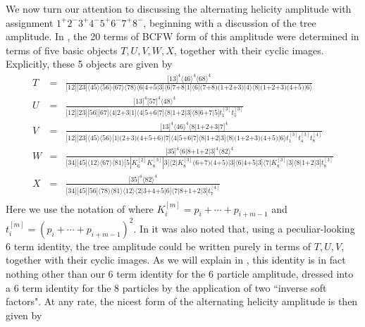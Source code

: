 \documentclass[12pt]{article}
\newcommand{\nn}{\nonumber}
\newcommand{\be}{\begin{eqnarray}}
\newcommand{\ee}{\end{eqnarray}}
\begin{document}
We now turn our attention to discussing the alternating helicity amplitude with assignment $1^+ 2^- 3^+ 4^- 5^+ 6^- 7^+ 8^-$, beginning with a discussion of the tree amplitude. In \cite{bcf}, the 20 terms of BCFW form of this amplitude were determined in terms of five basic objects $T,U,V,W,X$, together with their cyclic images. Explicitly, these 5 objects are given by
\be
T\! &=&\! \frac{\text{[13]}^4 \text{$\langle $46$\rangle $}^4
   \text{$\langle $68$\rangle $}^4}{\text{[12]} \text{[23]}
   \text{$\langle $45$\rangle $} \text{$\langle $56$\rangle
   $}\text{$\langle
   $67$\rangle $} \text{$\langle $78$\rangle $} \text{$\langle $6$|$4+5$|$3]} \text{$\langle
   $6$|$7+8$|$1]} \text{$\langle
   $6$|$(7+8)$$(1+2+3)$|$4$\rangle $}
   \text{$\langle $8$|$(1+2+3)$$(4+5)$|$6$\rangle $}} \nn\\
U\! &=&\! \frac{\text{[13]}^4 \text{[57]}^4 \text{$\langle
   $48$\rangle $}^4}{\text{[12]} \text{[23]} \text{[56]}
   \text{[67]} \text{$\langle $4$|$2+3$|$1]} \text{$\langle
   $4$|$5+6$|$7]} \text{$\langle $8$|$1+2$|$3]}
   \text{$\langle $8$|$6+7$|$5]} t_1^{[3]}t_5^{[3]} } \nn\\
V\! &=& \! \frac{\text{[13]}^4 \text{$\langle $46$\rangle $}^4
   \text{$\langle $8$|$1+2+3$|$7]}^4}{\text{[12]}\text{[23]}\text{$\langle $45$\rangle $}
   \text{$\langle $56$\rangle $}
   \text{[1$|$(2+3)$$(4+5+6)$|$7]}  \text{$\langle
   $4$|$5+6$|$7]}  \text{$\langle
   $8$|$1+2$|$3]} \text{$\langle
   $8$|$(1+2+3)$$(4+5)$|$6$\rangle $} t_1^{[3]}t_4^{[3]}t_8^{[4]}
   } \nn \\
W\! &=& \! \frac{\text{[35]}^4 \text{$\langle $6$|$8+1+2$|$3]}^4
   \text{$\langle $82$\rangle $}^4}{\text{[34]} \text{[45]}\text{$\langle $12$\rangle
   $}\text{$\langle $67$\rangle
   $} \text{$\langle
   $81$\rangle $} \text{[5$|K_6^{[2]}K_8^{[3]}|$3]}
  \text{$\langle $2$|K_8^{[3]}$(6+7)$$(4+5)$|$3]}
   \text{$\langle $6$|$4+5$|$3]}  \text{$\langle $7$|$$K_8^{[3]}$$|$3]}  \text{$\langle $8$|$1+2$|$3]}
   t_8^{[3]} }
   \nn \\
X\! &=&\! \frac{\text{[35]}^4 \text{$\langle $82$\rangle
   $}^4}{\text{[34]} \text{[45]} \text{[56]} \text{$\langle
   $78$\rangle $} \text{$\langle $81$\rangle $}\text{$\langle
   $12$\rangle $} \text{$\langle $2$|$3+4+5$|$6]}
   \text{$\langle $7$|$8+1+2$|$3]}
   t_7^{[4]}} \nn\\
\ee
Here we use the notation of \cite{bcf} where $K_i^{[m]}=p_i + \cdots + p_{i + m -1}$ and $t_i^{[m]} = (p_i + \cdots + p_{i + m -1})^2$.
In \cite{bcf} it was also noted that, using a peculiar-looking 6 term identity, the tree amplitude could be written purely in terms of $T,U,V$, together with their cyclic images. As we will explain in \cite{notes}, this identity is in fact nothing other than our 6 term identity for the 6 particle amplitude, dressed into a 6 term identity for the 8 particles by the application of two ``inverse soft factors". At any rate, the nicest form of the alternating helicity amplitude is then given by
\end{document}
